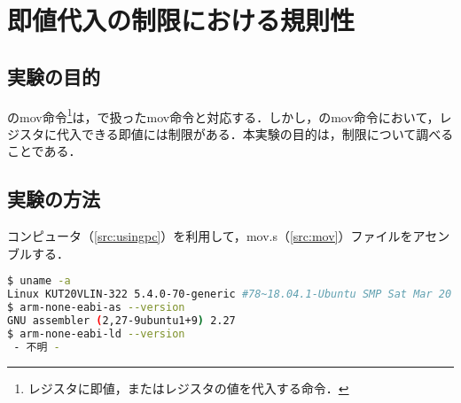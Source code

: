 \chapter{即値代入の制限における規則性}
\section{実験の目的}
\aasm の{\ttfamily mov}命令\footnote{レジスタに即値，またはレジスタの値を代入する命令．}は，\iasm で扱った{\ttfamily mov}命令と対応する．しかし，\aasm の{\ttfamily mov}命令において，レジスタに代入できる即値には制限がある．本実験の目的は，制限について調べることである．
\section{実験の方法}
コンピュータ（\ref{src:usingpc}）を利用して，{\ttfamily mov.s}（\ref{src:mov}）ファイルをアセンブルする．
\begin{lstlisting}[caption={利用コンピュータ及び実行環境},label={src:usingpc},language={Bash},numbers={none},breakindent={0pt}]
$ uname -a
Linux KUT20VLIN-322 5.4.0-70-generic #78~18.04.1-Ubuntu SMP Sat Mar 20 14:10:07 UTC 2021 x86_64 x86_64 x86_64 GNU/Linux
$ arm-none-eabi-as --version
GNU assembler (2,27-9ubuntu1+9) 2.27
$ arm-none-eabi-ld --version
 - 不明 - 
\end{lstlisting}
